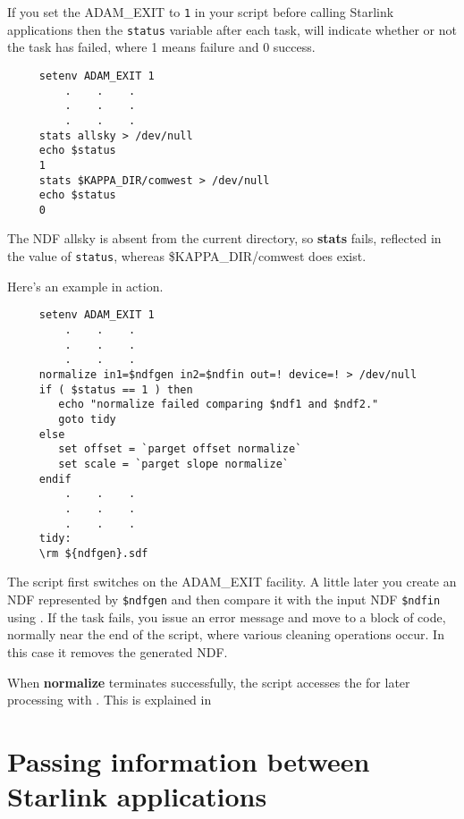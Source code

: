 If you set the ADAM\_EXIT  to {\tt 1} in your script before calling
Starlink applications then the {\tt status} variable after each task,
will indicate whether or not the task has failed, where 1 means
failure and 0 success.

\small
\begin{verbatim}
     setenv ADAM_EXIT 1
         .    .    .
         .    .    .
         .    .    .
     stats allsky > /dev/null
     echo $status
     1
     stats $KAPPA_DIR/comwest > /dev/null
     echo $status
     0
\end{verbatim}
\normalsize

The NDF allsky is absent from the current directory, so {\bf stats}
fails, reflected in the value of {\tt status}, whereas 
\$KAPPA\_DIR/comwest does exist.

Here's an example in action.
\small
\begin{verbatim}
     setenv ADAM_EXIT 1
         .    .    .
         .    .    .
         .    .    .
     normalize in1=$ndfgen in2=$ndfin out=! device=! > /dev/null
     if ( $status == 1 ) then
        echo "normalize failed comparing $ndf1 and $ndf2."
        goto tidy
     else
        set offset = `parget offset normalize`
        set scale = `parget slope normalize`
     endif
         .    .    .
         .    .    .
         .    .    .
     tidy:
     \rm ${ndfgen}.sdf
\end{verbatim}
\normalsize

The script first switches on the ADAM\_EXIT facility.  A little later
you create an NDF represented by {\tt \$ndfgen} and then compare it with
the input NDF {\tt \$ndfin} using .
If the task fails, you issue an error message and move to a block of
code, normally near the end of the script, where various cleaning 
operations occur.  In this case it removes the generated NDF.

When {\bf normalize} terminates successfully, the script accesses the
 for later processing
with .  This is explained in
\begin{htmlonly}
\end{htmlonly}

\newpage
\section{Passing information between
Starlink applications\label{sc4_se_passing_info}}

